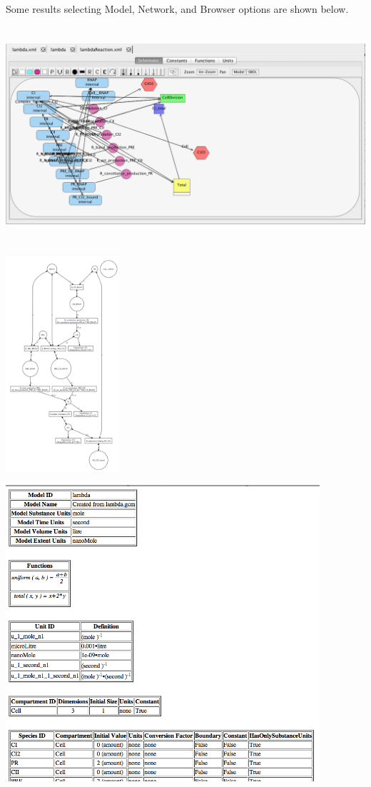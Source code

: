 \documentclass[titlepage,11pt]{article}
\begin{document}
Some results selecting Model, Network, and Browser options are shown below.

\begin{center}
\includegraphics[height=80mm]{screenshots/reactionModel}
\end{center}

\begin{center}
\includegraphics[height=80mm]{screenshots/viewNetwork}
\end{center}

\begin{center}
\includegraphics[height=110mm]{screenshots/viewBrowser}
\end{center}
\end{document}
